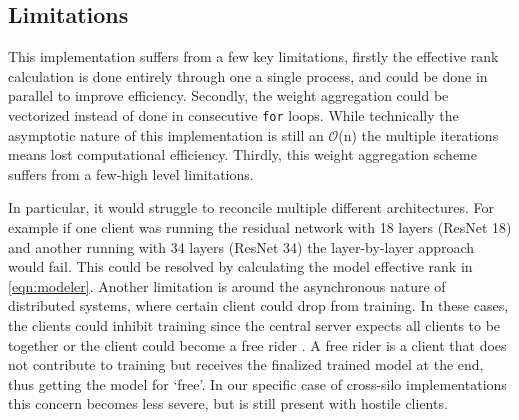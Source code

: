 

\subsection{Limitations}
This implementation suffers from a few key limitations, firstly the effective rank calculation is done entirely through one a single process, and could be done in parallel to improve efficiency. Secondly, the weight aggregation could be vectorized instead of done in consecutive \texttt{for} loops. While technically the asymptotic nature of this implementation is still an $\mathcal{O}$(n) the multiple iterations means lost computational efficiency. Thirdly, this weight aggregation scheme suffers from a few-high level limitations. 

In particular, it would struggle to reconcile multiple different architectures. For example if one client was running the residual network with 18 layers (ResNet 18) and another running with 34 layers (ResNet 34) \cite{he2016deep} the layer-by-layer approach would fail. This could be resolved by calculating the model effective rank in \autoref{eqn:modeler}. Another limitation is around the asynchronous nature of distributed systems, where certain client could drop from training. In these cases, the clients could inhibit training since the central server expects all clients to be together or the client could become a free rider \cite{fraboni2021free}. A free rider is a client that does not contribute to training but receives the finalized trained model at the end, thus getting the model for `free'. In our specific case of cross-silo implementations this concern becomes less severe, but is still present with hostile clients.
